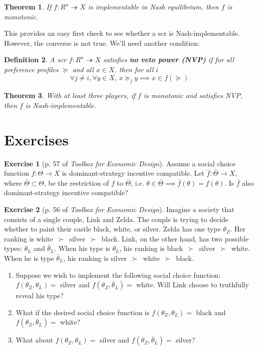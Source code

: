 \documentclass[letter, 10pt]{article}
\newtheorem{theorem}{Theorem}[section]
\newtheorem{definition}[theorem]{Definition}
\theoremstyle{definition}
\newtheorem{exercise}{Exercise}[section]
\begin{document}
\begin{spacing}{1.1}
\begin{theorem}
  If $f: R^n \twoheadrightarrow X$ is implementable in
  Nash equilibrium, then $f$ is monotonic.
\end{theorem}

This provides an easy first check to see whether a scr is
Nash-implementable. However, the converse is not
true. We'll need another condition:

\begin{definition}
  A scr $f: R^n \twoheadrightarrow X$ satisfies
  \textbf{no veto power (NVP)} if for all preference
  profiles $\succeq$ and all $x\in X$, then for all
  $i$ \[\forall j \neq i, \forall y\in X, \, x \succeq_j
  y \implies x\in f(\succeq)\]
\end{definition}

\begin{theorem}
  With at least three players, if $f$ is monotonic and
  satisfies NVP, then $f$ is Nash-implementable.
\end{theorem}

\section{Exercises}
\label{sec:exercises}

\begin{exercise}[p. 57 of \textit{Toolbox for Economic Design}]
  Assume a social choice function $f: \Theta \to X$ is
  dominant-strategy incentive compatible. Let $\bar{f}: \bar{\Theta} \to
  X$, where $\bar{\Theta} \subset \Theta$, be the restriction of $f$ to
  $\bar{\Theta}$, i.e. $\theta \in \bar{\Theta} \implies \bar{f}(\theta) =
  f(\theta)$. Is $\bar{f}$ also dominant-strategy incentive compatible?
\end{exercise}

\begin{exercise}[p. 56 of \textit{Toolbox for Economic Design}]
  Imagine a society that consists of a single couple, Link and Zelda. The
  couple is trying to decide whether to paint their castle black, white, or
  silver. Zelda has one type $\theta_Z$. Her ranking is
  white~$\succ$~silver~$\succ$~black. Link, on the other hand, has two
  possible types: $\theta_L$ and $\bar{\theta}_L$. When his type is
  $\theta_L$, his ranking is black~$\succ$~silver~$\succ$~white. When he is
  type $\bar{\theta}_L$, his ranking is
  silver~$\succ$~white~$\succ$~black.
  \begin{enumerate}
  \item Suppose we wish to implement the following social choice function:
    $f(\theta_Z, \theta_L) =$ silver and $f(\theta_Z, \bar{\theta}_L) =$
    white. Will Link choose to truthfully reveal his type?
  \item What if the desired social choice function is
    $f(\theta_Z, \theta_L) =$ black and $f(\theta_Z,
    \bar{\theta}_L) =$ white?
  \item What about  $f(\theta_Z, \theta_L) =$ silver and $f(\theta_Z,
  \bar{\theta}_L) =$ silver?
  \end{enumerate}
\end{exercise}


\end{spacing}
\end{document}
